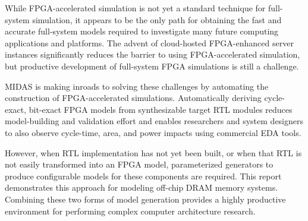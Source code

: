 While FPGA-accelerated simulation is not yet a standard technique for
full-system simulation, it appears to be the only path for obtaining the fast
and accurate full-system models required to investigate many future computing
applications and platforms. The advent of cloud-hosted FPGA-enhanced server
instances significantly reduces the barrier to using FPGA-accelerated
simulation, but productive development of full-system FPGA simulations is still
a challenge.

MIDAS is making inroads to solving these challenges by automating the
construction of FPGA-accelerated simulations. Automatically deriving
cycle-exact, bit-exact FPGA models from synthesizable target RTL modules
reduces model-building and validation effort and enables researchers and system
designers to also observe cycle-time, area, and power impacts using commercial
EDA tools.

However, when RTL implementation has not yet been built, or when that RTL is
not easily transformed into an FPGA model, parameterized generators to produce
configurable models for these components are required. This report demonstrates
this approach for modeling off-chip DRAM memory systems. Combining these two forms
of model generation provides a highly productive environment for performing
complex computer architecture research.
